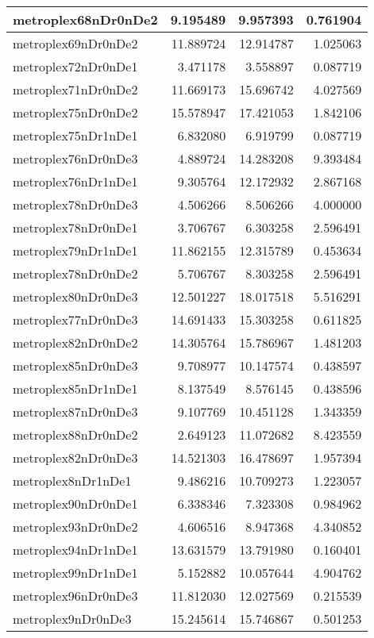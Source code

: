 \documentclass[../../../thesis.tex]{subfiles}
\begin{document}
\begin{longtable}{|l|r|r|r|}
metroplex68nDr0nDe2 & 9.195489 & 9.957393 & 0.761904 \\\hline
metroplex69nDr0nDe2 & 11.889724 & 12.914787 & 1.025063 \\\hline
metroplex72nDr0nDe1 & 3.471178 & 3.558897 & 0.087719 \\\hline
metroplex71nDr0nDe2 & 11.669173 & 15.696742 & 4.027569 \\\hline
metroplex75nDr0nDe2 & 15.578947 & 17.421053 & 1.842106 \\\hline
metroplex75nDr1nDe1 & 6.832080 & 6.919799 & 0.087719 \\\hline
metroplex76nDr0nDe3 & 4.889724 & 14.283208 & 9.393484 \\\hline
metroplex76nDr1nDe1 & 9.305764 & 12.172932 & 2.867168 \\\hline
metroplex78nDr0nDe3 & 4.506266 & 8.506266 & 4.000000 \\\hline
metroplex78nDr0nDe1 & 3.706767 & 6.303258 & 2.596491 \\\hline
metroplex79nDr1nDe1 & 11.862155 & 12.315789 & 0.453634 \\\hline
metroplex78nDr0nDe2 & 5.706767 & 8.303258 & 2.596491 \\\hline
metroplex80nDr0nDe3 & 12.501227 & 18.017518 & 5.516291 \\\hline
metroplex77nDr0nDe3 & 14.691433 & 15.303258 & 0.611825 \\\hline
metroplex82nDr0nDe2 & 14.305764 & 15.786967 & 1.481203 \\\hline
metroplex85nDr0nDe3 & 9.708977 & 10.147574 & 0.438597 \\\hline
metroplex85nDr1nDe1 & 8.137549 & 8.576145 & 0.438596 \\\hline
metroplex87nDr0nDe3 & 9.107769 & 10.451128 & 1.343359 \\\hline
metroplex88nDr0nDe2 & 2.649123 & 11.072682 & 8.423559 \\\hline
metroplex82nDr0nDe3 & 14.521303 & 16.478697 & 1.957394 \\\hline
metroplex8nDr1nDe1 & 9.486216 & 10.709273 & 1.223057 \\\hline
metroplex90nDr0nDe1 & 6.338346 & 7.323308 & 0.984962 \\\hline
metroplex93nDr0nDe2 & 4.606516 & 8.947368 & 4.340852 \\\hline
metroplex94nDr1nDe1 & 13.631579 & 13.791980 & 0.160401 \\\hline
metroplex99nDr1nDe1 & 5.152882 & 10.057644 & 4.904762 \\\hline
metroplex96nDr0nDe3 & 11.812030 & 12.027569 & 0.215539 \\\hline
metroplex9nDr0nDe3 & 15.245614 & 15.746867 & 0.501253 \\\hline
\end{longtable}
\end{document}
